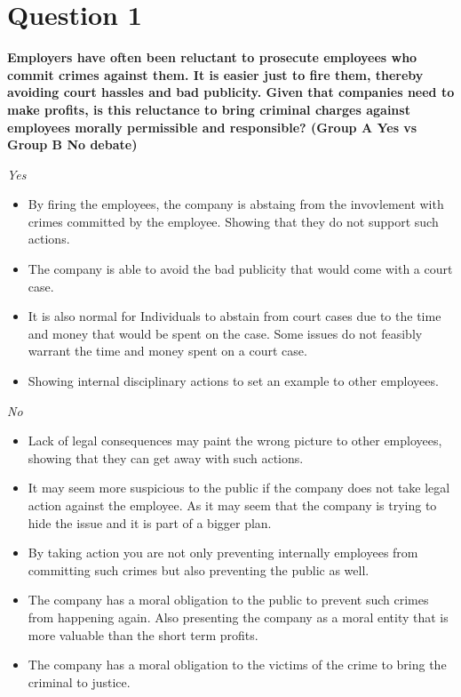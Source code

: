 \documentclass{article}
\begin{document}
\section*{Question 1}
\textbf{Employers have often been reluctant to prosecute employees who commit crimes against them. It is easier just to fire them, thereby avoiding court hassles and bad publicity. Given that companies need to make profits, is this reluctance to bring criminal charges against employees morally permissible and responsible? (Group A Yes vs Group B No debate)}

\textit{Yes}
\begin{itemize}
    \item By firing the employees, the company is abstaing from the invovlement with crimes committed by the employee. Showing that they do not support such actions.
    \item The company is able to avoid the bad publicity that would come with a court case.
    \item It is also normal for Individuals to abstain from court cases due to the time and money that would be spent on the case. Some issues do not feasibly warrant the time and money spent on a court case.
    \item Showing internal disciplinary actions to set an example to other employees.
\end{itemize}

\textit{No}
\begin{itemize}
    \item Lack of legal consequences may paint the wrong picture to other employees, showing that they can get away with such actions.
    \item It may seem more suspicious to the public if the company does not take legal action against the employee. As it may seem that the company is trying to hide the issue and it is part of a bigger plan.
    \item By taking action you are not only preventing internally employees from committing such crimes but also preventing the public as well.
    \item The company has a moral obligation to the public to prevent such crimes from happening again. Also presenting the company as a moral entity that is more valuable than the short term profits.
    \item The company has a moral obligation to the victims of the crime to bring the criminal to justice.
\end{itemize}
\end{document}
